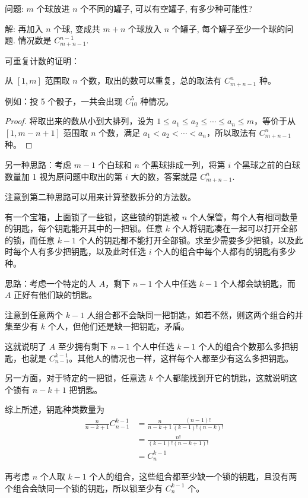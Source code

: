问题: $m$ 个球放进 $n$ 个不同的罐子, 可以有空罐子, 有多少种可能性?

解: 再加入 $n$ 个球, 变成共 $m+n$ 个球放入 $n$ 个罐子, 每个罐子至少一个球的问题. 情况数是 $C_{m+n-1}^{n-1}$.

\newpage


可重复计数的证明：

从 $ [1,m] $ 范围取 $ n $ 个数，取出的数可以重复，总的取法有 $ C_{m+n-1}^n $ 种。 

例如：投 5 个骰子，一共会出现 $ C_{10}^{5} $ 种情况。

\begin{proof}

将取出来的数从小到大排列，设为 $ 1 \le a_1 \le a_2 \le \cdots \le a_n \le m $，等价于从 $ [1,m-n+1] $ 范围取 $ n $ 个数，满足 $ a_1 < a_2 < \cdots < a_n $，所以取法有 $ C_{m+n-1}^n $ 种。

\end{proof}

另一种思路：考虑 $ m - 1 $ 个白球和 $ n $ 个黑球排成一列，将第 $ i $ 个黑球之前的白球数量加 1 视为原问题中取出的第 $ i $ 大的数，答案就是 $ C_{m+n-1}^n $.

注意到第二种思路可以用来计算整数拆分的方法数。

\newpage


有一个宝箱，上面锁了一些锁，这些锁的钥匙被 $ n $ 个人保管，每个人有相同数量的钥匙，每个钥匙能开其中的一把锁。任意 $ k $ 个人将钥匙凑在一起可以打开全部的锁，而任意 $ k - 1 $ 个人的钥匙都不能打开全部锁。求至少需要多少把锁，以及此时每个人有多少把钥匙，以及此时任选 $ i $ 个人的组合中每个人都有的钥匙有多少种。

思路：考虑一个特定的人 $ A $，剩下 $ n - 1 $ 个人中任选 $ k - 1 $ 个人都会缺钥匙，而 $ A $ 正好有他们缺的钥匙。

注意到任意两个 $ k - 1 $ 人组合都不会缺同一把钥匙，如若不然，则这两个组合的并集至少有 $ k $ 个人，但他们还是缺一把钥匙，矛盾。

这就说明了 $ A $ 至少拥有剩下 $ n - 1 $ 个人中任选 $ k - 1 $ 个人的组合个数那么多把钥匙，也就是 $ C_{n-1}^{k-1} $。其他人的情况也一样，这样每个人都至少有这么多把钥匙。

另一方面，对于特定的一把锁，任意选 $ k $ 个人都能找到开它的钥匙，这就说明这个锁有 $ n - k + 1 $ 把钥匙。

综上所述，钥匙种类数量为 
\begin{align*} 
\frac{n}{n-k+1}C_{n-1}^{k-1} &= \frac{n}{n-k+1}\frac{(n-1)!}{(k-1)!(n-k)!} \\
				&=\frac{n!}{(k-1)!(n-k+1)!} \\
				&=C_n^{k-1}
\end{align*}

再考虑 $ n $ 个人取 $ k - 1 $ 个人的组合，这些组合都至少缺一个锁的钥匙，且没有两个组合会缺同一个锁的钥匙，所以锁至少有 $ C_n^{k-1} $ 个。













